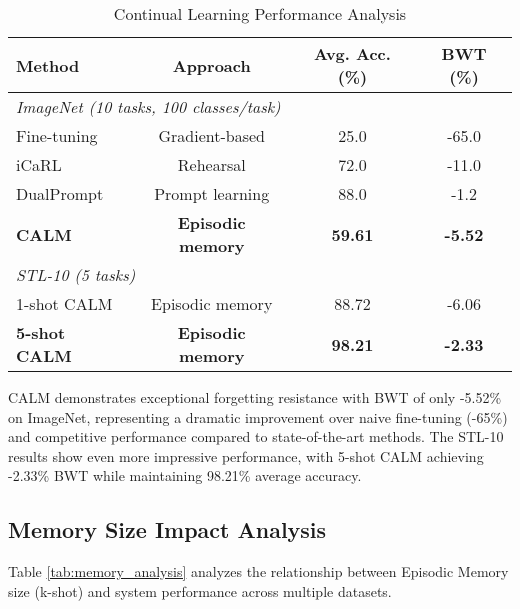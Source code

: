 \documentclass[conference]{IEEEtran}
\begin{document}
\begin{table}[h]
\centering
\caption{Continual Learning Performance Analysis}
\label{tab:continual}
\begin{tabular}{lccc}
\toprule
\textbf{Method} & \textbf{Approach} & \textbf{Avg. Acc. (\%)} & \textbf{BWT (\%)} \\
\midrule
\multicolumn{4}{l}{\textit{ImageNet (10 tasks, 100 classes/task)}} \\
Fine-tuning & Gradient-based & 25.0 & -65.0 \\
iCaRL & Rehearsal & 72.0 & -11.0 \\
DualPrompt & Prompt learning & 88.0 & -1.2 \\
\textbf{CALM} & \textbf{Episodic memory} & \textbf{59.61} & \textbf{-5.52} \\
\midrule
\multicolumn{4}{l}{\textit{STL-10 (5 tasks)}} \\
1-shot CALM & Episodic memory & 88.72 & -6.06 \\
\textbf{5-shot CALM} & \textbf{Episodic memory} & \textbf{98.21} & \textbf{-2.33} \\
\bottomrule
\end{tabular}
\end{table}

CALM demonstrates exceptional forgetting resistance with BWT of only -5.52\% on ImageNet, representing a dramatic improvement over naive fine-tuning (-65\%) and competitive performance compared to state-of-the-art methods. The STL-10 results show even more impressive performance, with 5-shot CALM achieving -2.33\% BWT while maintaining 98.21\% average accuracy.

\subsection{Memory Size Impact Analysis}

Table \ref{tab:memory_analysis} analyzes the relationship between Episodic Memory size (k-shot) and system performance across multiple datasets.
\end{document}
